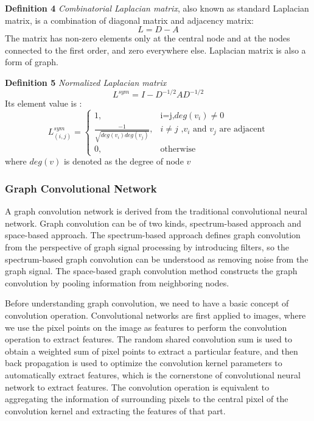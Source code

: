 \documentclass[%
reprint,
amsmath,amssymb,
aps,
]{revtex4-2}
\begin{document}
	\textbf{Definition 4} \textit{Combinatorial Laplacian matrix}, also known as standard Laplacian matrix, is a combination of diagonal matrix and adjacency matrix:
	\begin{equation}
		L = D - A
	\end{equation}
	The matrix has non-zero elements only at the central node and at the nodes connected to the first order, and zero everywhere else. Laplacian matrix is also a form of graph.
	
	\textbf{Definition 5} \textit{Normalized Laplacian matrix}
	\begin{equation}
		L^{sym} = I - D^{-1/2}AD^{-1/2}
	\end{equation}
	Its element value is :
	\begin{equation}
		L^{sym}_{(i,j)} = 
		\begin{cases}
			1,& \text{i=j,$deg(v_i)\ne0$} \\
			\frac {-1}{\sqrt{deg(v_i)deg(v_j)}},& \text{${i}\ne{j}$ ,$v_i$ and $v_j$ are adjacent}\\
			0,& \text{otherwise}
		\end{cases}
	\end{equation}
	where $deg(v)$ is denoted as the degree of node $v$
	\subsubsection{Graph Convolutional Network}
	A graph convolution network is  derived from the traditional convolutional neural network. Graph convolution can be of two kinds, spectrum-based approach and space-based approach. The spectrum-based approach defines graph convolution from the perspective of graph signal processing by introducing filters, so the spectrum-based graph convolution can be understood as removing noise from the graph signal. The space-based graph convolution method constructs the graph convolution by pooling information from neighboring nodes.
	
	Before understanding graph convolution, we need to have a basic concept of convolution operation. Convolutional networks are first applied to images, where we use the pixel points on the image as features to perform the convolution operation to extract features. The random shared convolution sum is used to obtain a weighted sum of pixel points to extract a particular feature, and then back propagation is used to optimize the convolution kernel parameters to automatically extract features, which is the cornerstone of convolutional neural network to extract features. The convolution operation is equivalent to aggregating the information of surrounding pixels to the central pixel of the convolution kernel and extracting the features of that part.
	
\end{document}
